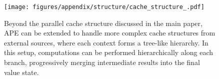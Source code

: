 \begin{figure}[ht]
    \centering
    \texttt{[image: figures/appendix/structure/cache\_structure\_.pdf]}
    \caption{Beyond the parallel cache structure discussed in the main paper, APE can be extended to handle more complex cache structures from external sources, where each context forms a tree-like hierarchy. In this setup, computations can be performed hierarchically along each branch, progressively merging intermediate results into the final value state.} 
    \label{fig:app:structure}
\end{figure}